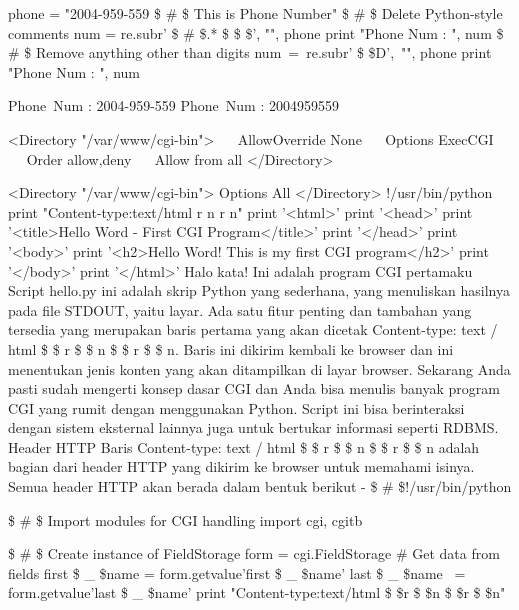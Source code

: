 \begin{12pt}
phone = "2004-959-559  \$  \#  \$ This is Phone Number" 
 \$  \#  \$ Delete Python-style comments 
num = re.sub{r' \$  \#  \$.* \$  \$  \$', "", phone} 
print "Phone Num : ", num 
 \$  \#  \$ Remove anything other than digits 
\noindent 
num~=~re.sub{r' \$  \setminus  \$D',~"", phone}     
print "Phone Num : ", num 
\begin{12pt}
\item 
Phone~Num :  2004-959-559 
Phone~Num :  2004959559 
\begin{12pt}
<Directory "/var/www/cgi-bin"> 
~~ AllowOverride None  
~~ Options ExecCGI  
~~ Order allow,deny 
~~ Allow from all 
</Directory> 
\begin{12pt}
<Directory "/var/www/cgi-bin"> 
Options All
</Directory> 
!/usr/bin/python 
print "Content-type:text/html   \setminus  r   \setminus  n   \setminus  r   \setminus  n" 
print '<html>' 
print '<head>' 
print '<title>Hello Word - First CGI Program</title>' 
print '</head>' 
print '<body>' 
print '<h2>Hello Word! This is my first CGI program</h2>' 
print '</body>' 
print '</html>' 
Halo kata! Ini adalah program CGI pertamaku 
Script hello.py ini adalah skrip Python yang sederhana, yang menuliskan hasilnya pada file STDOUT, yaitu layar. Ada satu fitur penting dan tambahan yang tersedia yang merupakan baris pertama yang akan dicetak Content-type: text / html  \$  \setminus  \$ r  \$  \setminus  \$ n  \$  \setminus  \$ r  \$  \setminus  \$ n. Baris ini dikirim kembali ke browser dan ini menentukan jenis konten yang akan ditampilkan di layar browser. Sekarang Anda pasti sudah mengerti konsep dasar CGI dan Anda bisa menulis banyak program CGI yang rumit dengan menggunakan Python. Script ini bisa berinteraksi dengan sistem eksternal lainnya juga untuk bertukar informasi seperti RDBMS. 
Header HTTP 
Baris Content-type: text / html  \$  \setminus  \$ r  \$  \setminus  \$ n  \$  \setminus  \$ r  \$  \setminus  \$ n adalah bagian dari header HTTP yang dikirim ke browser untuk memahami isinya. Semua header HTTP akan berada dalam bentuk berikut - 
 \$  \#  \$!/usr/bin/python \par
 \$  \#  \$ Import modules for CGI handling   
import cgi, cgitb  \par
 \$  \#  \$ Create instance of FieldStorage 
form = cgi.FieldStorage{}
   \#   Get data from fields 
first \$  \_  \$name = form.getvalue{'first \$  \_  \$name'}
last \$  \_  \$name~ = form.getvalue{'last \$  \_  \$name'}
print "Content-type:text/html \$  \setminus  \$r \$  \setminus  \$n \$  \setminus  \$r \$  \setminus  \$n" 

\end{12pt}
\end{12pt}
\end{12pt}
\end{12pt}
